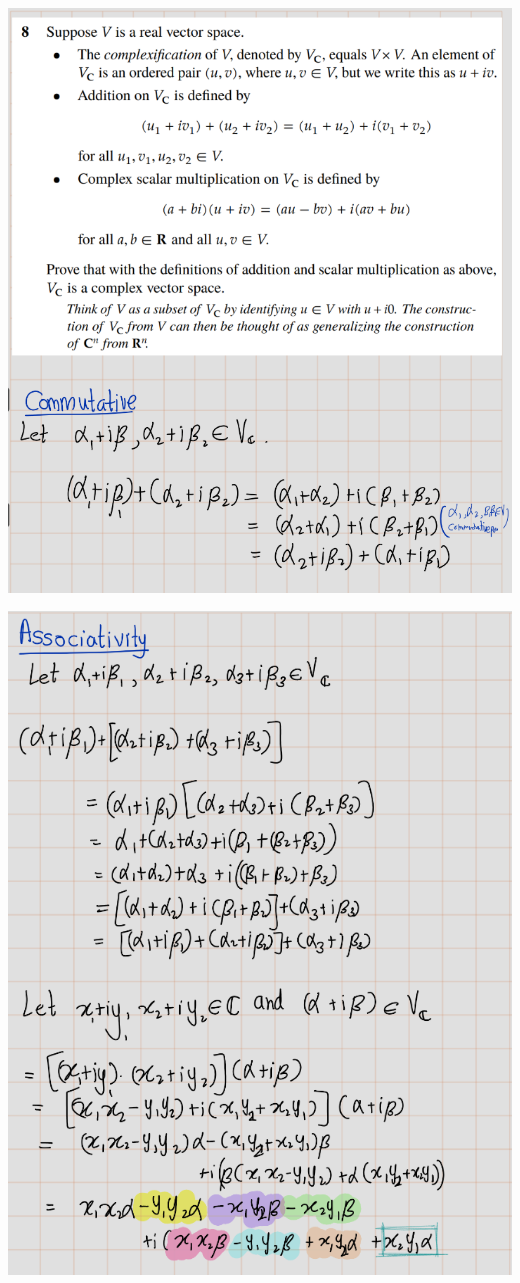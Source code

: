 \documentclass[
]{book}
\theoremstyle{definition}
\theoremstyle{definition}
\theoremstyle{definition}
\theoremstyle{definition}
\theoremstyle{remark}
\begin{document}
\includegraphics{fig/Ex1B/Ex8-1.png}

\includegraphics{fig/Ex1B/Ex8-2.png}
\end{document}
